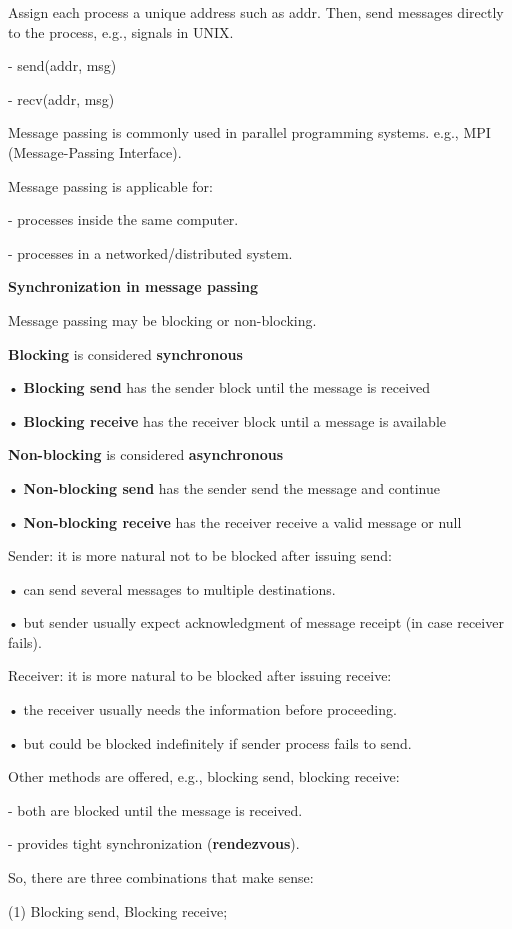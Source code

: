 \documentclass[]{report}
\begin{document}
Assign each process a unique address such as addr. Then,
send messages directly to the process, e.g., signals in UNIX.

- send(addr, msg)

- recv(addr, msg)

Message passing is commonly used in parallel
programming systems.
e.g., MPI (Message-Passing Interface).

Message passing is applicable for:

- processes inside the same computer.

- processes in a networked/distributed system.

\textbf{Synchronization in message passing}

Message passing may be blocking or non-blocking.

\textbf{Blocking} is considered \textbf{synchronous}

• \textbf{Blocking send} has the sender block until the message is
received

• \textbf{Blocking receive} has the receiver block until a message is
available

\textbf{Non-blocking} is considered \textbf{asynchronous}

• \textbf{Non-blocking send} has the sender send the message and
continue

• \textbf{Non-blocking receive} has the receiver receive a valid
message or null

Sender: it is more natural not to be blocked after
issuing send:

• can send several messages to multiple destinations.

• but sender usually expect acknowledgment of
message receipt (in case receiver fails).

Receiver: it is more natural to be blocked after issuing
receive:

• the receiver usually needs the information before
proceeding.

• but could be blocked indefinitely if sender process
fails to send.

Other methods are offered, e.g., blocking send,
blocking receive:

- both are blocked until the message is
received.

- provides tight synchronization (\textbf{rendezvous}).

So, there are three combinations that make sense:

(1) Blocking send, Blocking receive;
\end{document}
